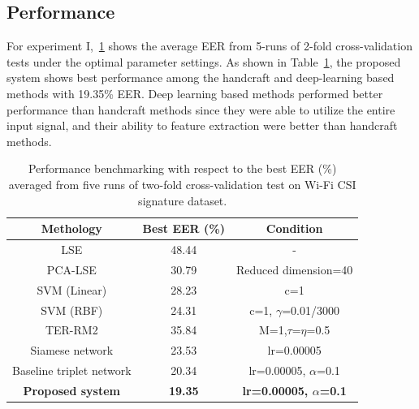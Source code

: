 \subsection{Performance}
For experiment I,~\ref{tab_performance} shows the average EER from 5-runs of 2-fold cross-validation tests under the optimal parameter settings. As shown in Table~\ref{tab_performance}, the proposed system shows best performance among the handcraft and deep-learning based methods with 19.35\% EER.
Deep learning based methods performed better performance than handcraft methods since they were able to utilize the entire input signal, and their ability to feature extraction were better than handcraft methods.
\begin{table}[!h]
    \caption{Performance benchmarking with respect to the best EER (\%) averaged from five runs of two-fold cross-validation test on Wi-Fi CSI signature dataset.}\label{tab_performance}
    \centering
    \begin{tabular}{|c|c|c|}
    \hline
    Methology   &   Best EER (\%) &   Condition   \\  \hline
    LSE &   48.44   &  - \\ 
    PCA-LSE    &   30.79   &  Reduced dimension=40    \\
    SVM (Linear) &   28.23   &   c=1 \\
    SVM (RBF)    &   24.31   &   c=1, $\gamma$=0.01/3000 \\
    TER-RM2 &   35.84   &  M=1,$\tau$=$\eta$=0.5   \\     \hline
    Siamese network  &   23.53   &   lr=0.00005  \\
    Baseline triplet network &   20.34   &   lr=0.00005, $\alpha$=0.1  \\
    \textbf{Proposed system} &   \textbf{19.35}   &  \textbf{lr=0.00005, $\alpha$=0.1}  \\
     \hline
    \end{tabular}
\end{table}

